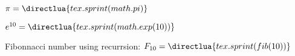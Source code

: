 \documentclass{article}
\begin{document}
	$\pi = \directlua{tex.sprint(math.pi)}$\par
	$e^{10} = \directlua{tex.sprint(math.exp(10))}$\par
	Fibonnacci number using recurrsion: $F_{10} = \directlua{tex.sprint(fib(10))}$
\end{document}
